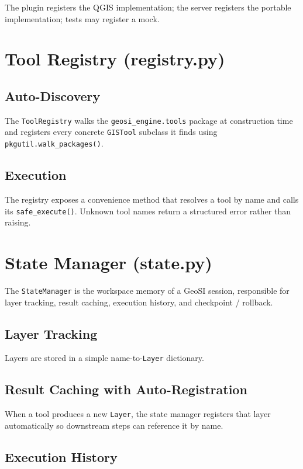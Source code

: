\documentclass[12pt,a4paper]{report}
\begin{document}
The plugin registers the QGIS implementation; the server registers the portable implementation; tests may register a mock.

\section{Tool Registry (registry.py)}

\subsection{Auto-Discovery}

The \texttt{ToolRegistry} walks the \texttt{geosi\_engine.tools} package at construction time and registers every concrete \texttt{GISTool} subclass it finds using \texttt{pkgutil.walk\_packages()}.

\subsection{Execution}

The registry exposes a convenience method that resolves a tool by name and calls its \texttt{safe\_execute()}.  Unknown tool names return a structured error rather than raising.

\section{State Manager (state.py)}

The \texttt{StateManager} is the workspace memory of a GeoSI session, responsible for layer tracking, result caching, execution history, and checkpoint / rollback.

\subsection{Layer Tracking}

Layers are stored in a simple name-to-\texttt{Layer} dictionary.

\subsection{Result Caching with Auto-Registration}

When a tool produces a new \texttt{Layer}, the state manager registers that layer automatically so downstream steps can reference it by name.

\subsection{Execution History}
\end{document}
